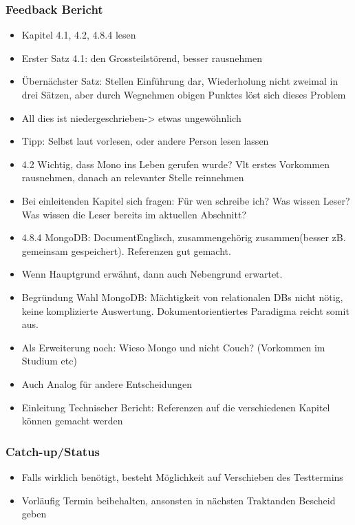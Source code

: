 \hypertarget{feedback-bericht}{%
\subsubsection*{Feedback Bericht}\label{feedback-bericht}}

\begin{itemize}
\item
  Kapitel 4.1, 4.2, 4.8.4 lesen
\item
  Erster Satz 4.1: \grqq den Grossteil\grqq störend, besser rausnehmen
\item
  Übernächster Satz: \grqq Stellen Einführung dar\grqq, Wiederholung nicht
  zweimal in drei Sätzen, aber durch Wegnehmen obigen Punktes löst sich
  dieses Problem
\item
  \grqq All dies ist niedergeschrieben\grqq -\textgreater{} etwas ungewöhnlich
\item
  Tipp: Selbst laut vorlesen, oder andere Person lesen lassen
\item
  4.2 Wichtig, dass Mono ins Leben gerufen wurde? Vlt erstes Vorkommen
  rausnehmen, danach an relevanter Stelle reinnehmen
\item
  Bei einleitenden Kapitel sich fragen: Für wen schreibe ich? Was wissen
  Leser? Was wissen die Leser bereits im aktuellen Abschnitt?
\item
  4.8.4 MongoDB: \grqq Document\grqq Englisch, \grqq zusammengehörig zusammen\grqq (besser
  zB. gemeinsam gespeichert). Referenzen gut gemacht.
\item
  Wenn Hauptgrund erwähnt, dann auch Nebengrund erwartet.
\item
  Begründung Wahl MongoDB: Mächtigkeit von relationalen DBs nicht nötig,
  keine komplizierte Auswertung. Dokumentorientiertes Paradigma reicht
  somit aus.
\item
  Als Erweiterung noch: Wieso Mongo und nicht Couch? (Vorkommen im
  Studium etc)
\item
  Auch Analog für andere Entscheidungen
\item
  Einleitung Technischer Bericht: Referenzen auf die verschiedenen
  Kapitel können gemacht werden
\end{itemize}

\hypertarget{catch-upstatus}{%
\subsubsection*{Catch-up/Status}\label{catch-upstatus}}

\begin{itemize}

\item
  Falls wirklich benötigt, besteht Möglichkeit auf Verschieben des
  Testtermins
\item
  Vorläufig Termin beibehalten, ansonsten in nächsten Traktanden
  Bescheid geben
\end{itemize}

